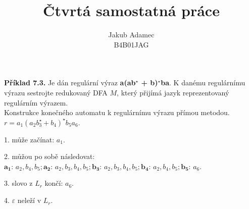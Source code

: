 \documentclass[11pt]{article}
\begin{document}

\newcommand\splitpage[2]{
      \begin{minipage}[t]{0.45\textwidth}#1
      \end{minipage}%
      \hfill
      \begin{minipage}[t]{0.45\textwidth}#2
      \end{minipage}
}
 
 
\title{\textbf{Čtvrtá samostatná práce}}%
\author{Jakub Adamec\\ %
B4B01JAG} %

\maketitle

\textbf{Příklad 7.3.} Je dán regulární výraz \textbf{a(ab$^\star$ + b)$^\star$ba}. K danému regulárnímu výrazu sestrojte redukovaný DFA $M$, který přijímá jazyk reprezentovaný regulárním výrazem.
\\

Konstrukce konečného automatu k regulárnímu výrazu přímou metodou.
$r = a_1 (a_2 b_3^\star + b_4)^\star b_5 a_6$.

1. může začínat: $a_1$.

2. můžou po sobě následovat: $\bm{a_1} \text{: } a_2, b_4, b_5; \bm{a_2}\text{: } a_2, b_3, b_4, b_5; \bm{b_3}\text{: } a_2, b_3, b_4, b_5; \bm{b_4}\text{: } a_2, b_4, b_5; \bm{b_5}\text{: } a_6$.

3. slovo z $L_r$ končí: $a_6$.

4. $\varepsilon$ neleží v $L_r$.
\end{document}
